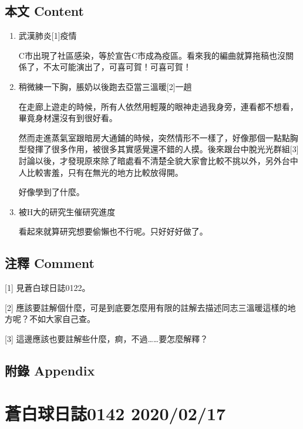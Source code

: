 \documentclass[
]{article}
\begin{document}
\hypertarget{ux672cux6587-content-77}{%
\subsection{本文 Content}\label{ux672cux6587-content-77}}

\begin{enumerate}
\def\labelenumi{\arabic{enumi}.}
\item
  武漢肺炎{[}1{]}疫情

  C市出現了社區感染，等於宣告C市成為疫區。看來我的編曲就算拖稿也沒關係了，不太可能演出了，可喜可賀！可喜可賀！
\item
  稍微練一下胸，脹奶以後跑去亞當三溫暖{[}2{]}一趟

  在走廊上遊走的時候，所有人依然用輕蔑的眼神走過我身旁，連看都不想看，畢竟身材還沒有到很好看。

  然而走進蒸氣室跟暗房大通鋪的時候，突然情形不一樣了，好像那個一點點胸型發揮了很多作用，被很多其實感覺還不錯的人摸。後來跟台中脫光光群組{[}3{]}討論以後，才發現原來除了暗處看不清楚全貌大家會比較不挑以外，另外台中人比較害羞，只有在無光的地方比較放得開。

  好像學到了什麼。
\item
  被H大的研究生催研究進度

  看起來就算研究想要偷懶也不行呢。只好好好做了。
\end{enumerate}

\hypertarget{ux6ce8ux91cb-comment-76}{%
\subsection{注釋 Comment}\label{ux6ce8ux91cb-comment-76}}

{[}1{]} 見蒼白球日誌0122。

{[}2{]}
應該要註解個什麼，可是到底要怎麼用有限的註解去描述同志三溫暖這樣的地方呢？不如大家自己查。

{[}3{]} 這邊應該也要註解些什麼，痾，不過\ldots\ldots 要怎麼解釋？

\hypertarget{ux9644ux9304-appendix-77}{%
\subsection{附錄 Appendix}\label{ux9644ux9304-appendix-77}}

\hypertarget{ux84bcux767dux7403ux65e5ux8a8c0142-20200217}{%
\section{蒼白球日誌0142
2020/02/17}\label{ux84bcux767dux7403ux65e5ux8a8c0142-20200217}}
\end{document}
